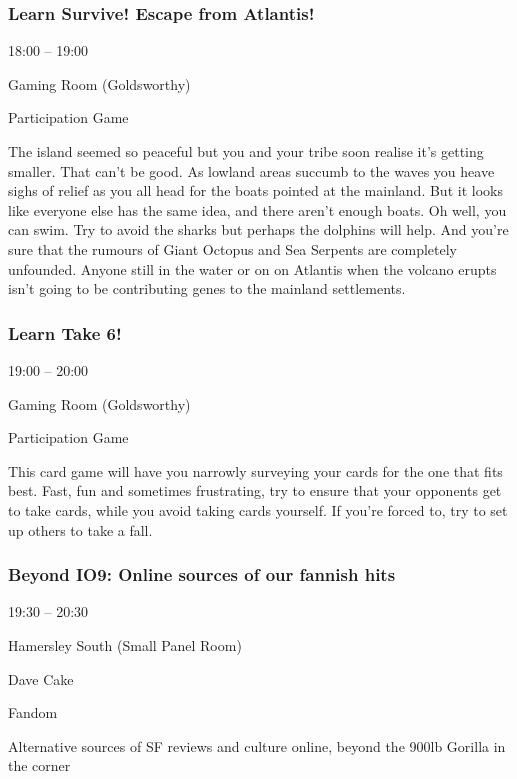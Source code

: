 \documentclass{scrreprt}
\begin{document}
\begin{multicols}{2}
\subsubsection*{Learn Survive! Escape from Atlantis!}\begin{description}
\setlength{\itemsep}{0pt}
\setlength{\parsep}{0pt}
\setlength{\parskip}{0pt}
\item[Time:]{18:00 -- 19:00}
\item[Venue:]{Gaming Room (Goldsworthy)}
\item[Tags:]{Participation Game}\end{description}
The island seemed so peaceful but you and your tribe soon realise it's getting smaller. That can't be good. As lowland areas succumb to the waves you heave sighs of relief as you all head for the boats pointed at the mainland. But it looks like everyone else has the same idea, and there aren't enough boats. Oh well, you can swim. Try to avoid the sharks but perhaps the dolphins will help. And you're sure that the rumours of Giant Octopus and Sea Serpents are completely unfounded. Anyone still in the water or on on Atlantis when the volcano erupts isn't going to be contributing genes to the mainland settlements.
\subsubsection*{Learn Take 6!}\begin{description}
\setlength{\itemsep}{0pt}
\setlength{\parsep}{0pt}
\setlength{\parskip}{0pt}
\item[Time:]{19:00 -- 20:00}
\item[Venue:]{Gaming Room (Goldsworthy)}
\item[Tags:]{Participation Game}\end{description}
This card game will have you narrowly surveying your cards for the one that fits best. Fast, fun and sometimes frustrating, try to ensure that your opponents get to take cards, while you avoid taking cards yourself. If you're forced to, try to set up others to take a fall.
\subsubsection*{Beyond IO9: Online sources of our fannish hits}\begin{description}
\setlength{\itemsep}{0pt}
\setlength{\parsep}{0pt}
\setlength{\parskip}{0pt}
\item[Time:]{19:30 -- 20:30}
\item[Venue:]{Hamersley South (Small Panel Room)}
\item[People:]{Dave Cake}
\item[Tags:]{Fandom}\end{description}
Alternative sources of SF reviews and culture online, beyond the 900lb Gorilla in the corner

\end{multicols}
\end{document}

